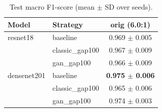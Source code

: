 \begin{table}[htbp]
\centering
\caption{Test macro F1-score (mean $\pm$ SD over seeds).}
\label{tab:macro_f1}
\begin{tabular}{llc}
\toprule
Model & Strategy & orig (6.0:1) \\
\midrule
resnet18 & baseline & 0.969 $\pm$ 0.005 \\
 & classic\_gap100 & 0.967 $\pm$ 0.009 \\
 & gan\_gap100 & 0.966 $\pm$ 0.009 \\
\addlinespace
densenet201 & baseline & \textbf{0.975 $\pm$ 0.006} \\
 & classic\_gap100 & 0.965 $\pm$ 0.006 \\
 & gan\_gap100 & 0.974 $\pm$ 0.003 \\
\bottomrule
\end{tabular}
\end{table}